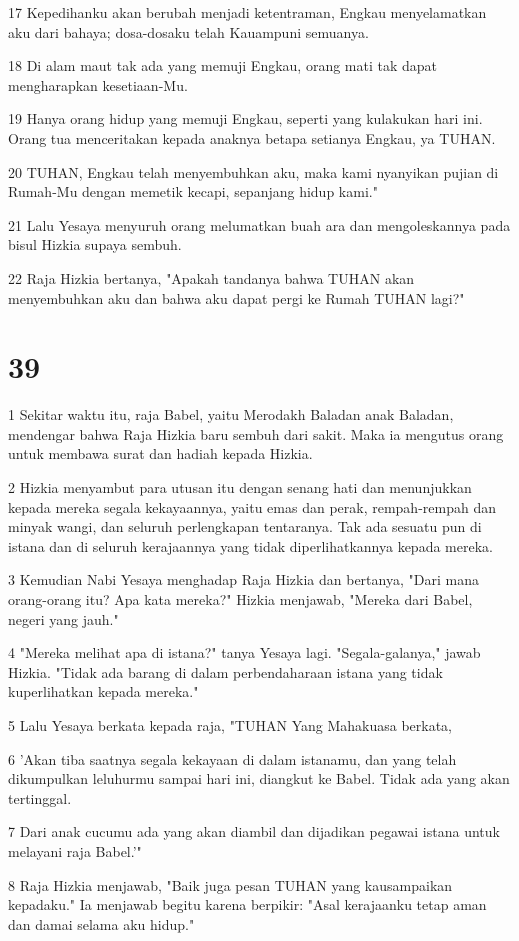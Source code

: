 \par 17 Kepedihanku akan berubah menjadi ketentraman, Engkau menyelamatkan aku dari bahaya; dosa-dosaku telah Kauampuni semuanya.
\par 18 Di alam maut tak ada yang memuji Engkau, orang mati tak dapat mengharapkan kesetiaan-Mu.
\par 19 Hanya orang hidup yang memuji Engkau, seperti yang kulakukan hari ini. Orang tua menceritakan kepada anaknya betapa setianya Engkau, ya TUHAN.
\par 20 TUHAN, Engkau telah menyembuhkan aku, maka kami nyanyikan pujian di Rumah-Mu dengan memetik kecapi, sepanjang hidup kami."
\par 21 Lalu Yesaya menyuruh orang melumatkan buah ara dan mengoleskannya pada bisul Hizkia supaya sembuh.
\par 22 Raja Hizkia bertanya, "Apakah tandanya bahwa TUHAN akan menyembuhkan aku dan bahwa aku dapat pergi ke Rumah TUHAN lagi?"

\chapter{39}

\par 1 Sekitar waktu itu, raja Babel, yaitu Merodakh Baladan anak Baladan, mendengar bahwa Raja Hizkia baru sembuh dari sakit. Maka ia mengutus orang untuk membawa surat dan hadiah kepada Hizkia.
\par 2 Hizkia menyambut para utusan itu dengan senang hati dan menunjukkan kepada mereka segala kekayaannya, yaitu emas dan perak, rempah-rempah dan minyak wangi, dan seluruh perlengkapan tentaranya. Tak ada sesuatu pun di istana dan di seluruh kerajaannya yang tidak diperlihatkannya kepada mereka.
\par 3 Kemudian Nabi Yesaya menghadap Raja Hizkia dan bertanya, "Dari mana orang-orang itu? Apa kata mereka?" Hizkia menjawab, "Mereka dari Babel, negeri yang jauh."
\par 4 "Mereka melihat apa di istana?" tanya Yesaya lagi. "Segala-galanya," jawab Hizkia. "Tidak ada barang di dalam perbendaharaan istana yang tidak kuperlihatkan kepada mereka."
\par 5 Lalu Yesaya berkata kepada raja, "TUHAN Yang Mahakuasa berkata,
\par 6 'Akan tiba saatnya segala kekayaan di dalam istanamu, dan yang telah dikumpulkan leluhurmu sampai hari ini, diangkut ke Babel. Tidak ada yang akan tertinggal.
\par 7 Dari anak cucumu ada yang akan diambil dan dijadikan pegawai istana untuk melayani raja Babel.'"
\par 8 Raja Hizkia menjawab, "Baik juga pesan TUHAN yang kausampaikan kepadaku." Ia menjawab begitu karena berpikir: "Asal kerajaanku tetap aman dan damai selama aku hidup."

